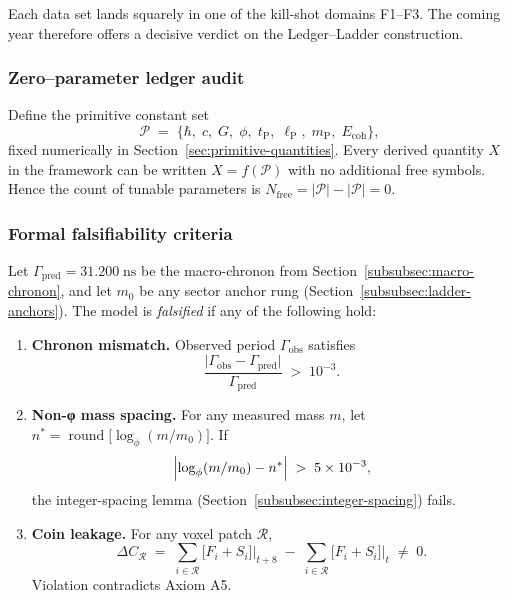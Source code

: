 \documentclass[11pt,oneside]{book}
\begin{document}
Each data set lands squarely in one of the kill-shot domains F1–F3.
The coming year therefore offers a decisive verdict on the
Ledger–Ladder construction.


\subsubsection{Zero–parameter ledger audit}
\label{subsubsec:zero-param}
Define the primitive constant set
\[
  \mathcal{P}
  \;=\;
  \{\hbar,\;c,\;G,\;\phi,\;
    t_{\text{P}},\;\ell_{\text{P}},\;m_{\text{P}},\;
    E_{\text{coh}}\},
\]
fixed numerically in
Section~\ref{sec:primitive-quantities}.  
Every derived quantity \(X\) in the framework can be written
\(X = f(\mathcal{P})\) with no additional free symbols.
Hence the count of tunable parameters is
\(
  N_{\text{free}} = |\mathcal{P}| - |\mathcal{P}| = 0.
\)

\subsubsection{Formal falsifiability criteria}
\label{subsubsec:falsify-criteria}
Let \(\Gamma_{\text{pred}} = 31.200\;\text{ns}\) be the
macro-chronon from Section~\ref{subsubsec:macro-chronon},
and let \(m_{0}\) be any sector anchor rung
(Section~\ref{subsubsec:ladder-anchors}).  
The model is \emph{falsified} if any of the following hold:

\begin{enumerate}[label=\textbf{F\arabic*:}, leftmargin=3em]
  \item \textbf{Chronon mismatch.}\;
        Observed period \(\Gamma_{\text{obs}}\) satisfies
        \[
          \frac{\lvert\Gamma_{\text{obs}}-\Gamma_{\text{pred}}\rvert}
               {\Gamma_{\text{pred}}}
          \;>\;10^{-3}.
        \]
  \item \textbf{Non-φ mass spacing.}\;
        For any measured mass \(m\),
        let \(n^{\ast}=\operatorname*{round}\!\bigl[\log_{\phi}(m/m_{0})\bigr]\).
        If
        \[
          \Bigl\lvert\log_{\phi}(m/m_{0})-n^{\ast}\Bigr\rvert
          \;>\;5\times10^{-3},
        \]
        the integer-spacing lemma
        (Section~\ref{subsubsec:integer-spacing}) fails.
  \item \textbf{Coin leakage.}\;
        For any voxel patch \(\mathcal{R}\),
        \[
          \Delta C_{\mathcal{R}}
            \;=\;
            \sum_{i\in\mathcal{R}}
            \bigl[F_{i}+S_{i}\bigr]\Big|_{t+8}
            \;-\;
            \sum_{i\in\mathcal{R}}
            \bigl[F_{i}+S_{i}\bigr]\Big|_{t}
          \;\neq\;0.
        \]
        Violation contradicts Axiom A5.
\end{enumerate}
\end{document}

